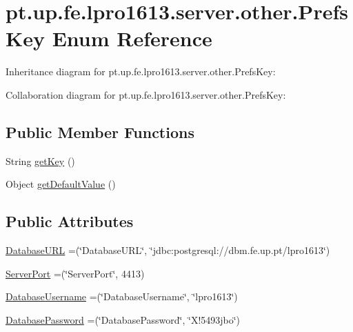 \hypertarget{enumpt_1_1up_1_1fe_1_1lpro1613_1_1server_1_1other_1_1_prefs_key}{}\section{pt.\+up.\+fe.\+lpro1613.\+server.\+other.\+Prefs\+Key Enum Reference}
\label{enumpt_1_1up_1_1fe_1_1lpro1613_1_1server_1_1other_1_1_prefs_key}


Inheritance diagram for pt.\+up.\+fe.\+lpro1613.\+server.\+other.\+Prefs\+Key\+:


Collaboration diagram for pt.\+up.\+fe.\+lpro1613.\+server.\+other.\+Prefs\+Key\+:
\subsection*{Public Member Functions}
\begin{DoxyCompactItemize}
\item 
String \hyperlink{enumpt_1_1up_1_1fe_1_1lpro1613_1_1server_1_1other_1_1_prefs_key_ab78cc090bf215b90b4387473ae17524a}{get\+Key} ()
\item 
Object \hyperlink{enumpt_1_1up_1_1fe_1_1lpro1613_1_1server_1_1other_1_1_prefs_key_ab8700091048a80f746647cebab8a1876}{get\+Default\+Value} ()
\end{DoxyCompactItemize}
\subsection*{Public Attributes}
\begin{DoxyCompactItemize}
\item 
\hyperlink{enumpt_1_1up_1_1fe_1_1lpro1613_1_1server_1_1other_1_1_prefs_key_a2805e6e6a98551242a1f0d86fc55a156}{Database\+U\+RL} =(\char`\"{}Database\+U\+RL\char`\"{}, \char`\"{}jdbc\+:postgresql\+://dbm.\+fe.\+up.\+pt/lpro1613\char`\"{})
\item 
\hyperlink{enumpt_1_1up_1_1fe_1_1lpro1613_1_1server_1_1other_1_1_prefs_key_a92ee06ea77e828cd8272275f9309e142}{Server\+Port} =(\char`\"{}Server\+Port\char`\"{}, 4413)
\item 
\hyperlink{enumpt_1_1up_1_1fe_1_1lpro1613_1_1server_1_1other_1_1_prefs_key_a1f5081d54a2b9ebb5e46de69a24b9853}{Database\+Username} =(\char`\"{}Database\+Username\char`\"{}, \char`\"{}lpro1613\char`\"{})
\item 
\hyperlink{enumpt_1_1up_1_1fe_1_1lpro1613_1_1server_1_1other_1_1_prefs_key_a47cf4dbfe663d670dceb3ca51b4e4f79}{Database\+Password} =(\char`\"{}Database\+Password\char`\"{}, \char`\"{}X!5493jbo\char`\"{})
\end{DoxyCompactItemize}


